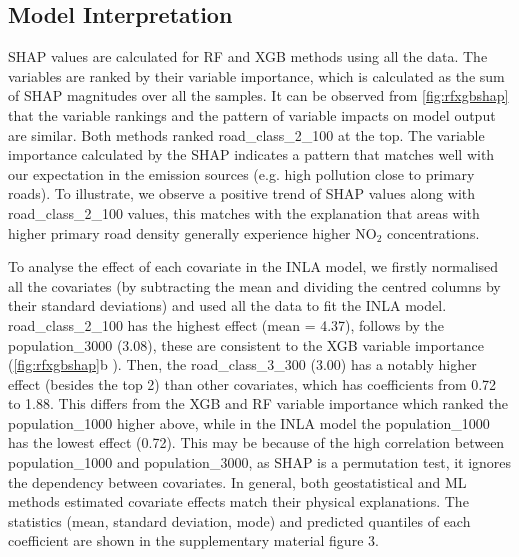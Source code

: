 \documentclass{article}
\begin{document}
\subsection{Model Interpretation} 

SHAP values are calculated for RF and XGB methods using all the data. The variables are ranked by their variable importance, which is calculated as the sum of SHAP magnitudes over all the samples. It can be observed from \cref{fig:rfxgbshap} that the variable rankings and the pattern of variable impacts on model output are similar. Both methods ranked road\_class\_2\_100 at the top. The variable importance calculated by the SHAP indicates a pattern that matches well with our expectation in the emission sources (e.g. high pollution close to primary roads). To illustrate, we observe a positive trend of SHAP values along with road\_class\_2\_100 values, this matches with the explanation that areas with higher primary road density generally experience higher NO$_2$ concentrations.

To analyse the effect of each covariate in the INLA model, we firstly normalised all the covariates (by subtracting the mean and dividing the centred columns by their standard deviations) and used all the data to fit the INLA model. road\_class\_2\_100 has the highest effect (mean = 4.37), follows by the population\_3000 (3.08), these are consistent to the XGB variable importance (\cref{fig:rfxgbshap}b ). Then, the road\_class\_3\_300 (3.00) has a notably higher effect (besides the top 2) than other covariates, which has coefficients from 0.72 to 1.88. This differs from the XGB and RF variable importance which ranked the population\_1000 higher above, while in the INLA model the population\_1000 has the lowest effect (0.72). This may be because of the high correlation between population\_1000 and population\_3000, as SHAP is a permutation test, it ignores the dependency between covariates. In general, both geostatistical and ML methods estimated covariate effects match their physical explanations. The statistics (mean, standard deviation, mode) and predicted quantiles of each coefficient are shown in the supplementary material figure 3. 
\end{document}

